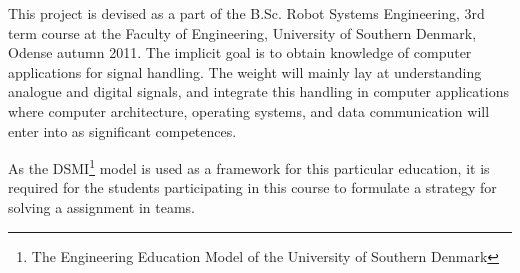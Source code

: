This project is devised as a part of the B.Sc. Robot Systems Engineering, 3rd term course at the Faculty of Engineering, University of Southern Denmark, Odense autumn 2011. The implicit goal is to obtain knowledge of computer applications for signal handling. The weight will mainly lay at understanding analogue and digital signals, and integrate this handling in computer applications where computer architecture, operating systems, and data communication will enter into as significant competences.

As the DSMI\footnote{The Engineering Education Model of the University of Southern Denmark} model is used as a framework for this particular education, it is required for the students participating in this course to formulate a strategy for solving a assignment in teams.